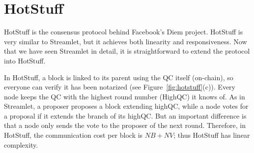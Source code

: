\documentclass{article}
\newcommand{\pramod}[1]{{\color{red}
\footnotesize[Pramod: #1] }}
\begin{document}


\section*{HotStuff}

HotStuff is the consensus protocol behind Facebook's Diem project. HotStuff is very similar to Streamlet, but it achieves both linearity and responsiveness. Now that we have seen Streamlet in detail, it is straightforward to extend the protocol into HotStuff. 

In HotStuff, a block is linked to its parent using the QC itself (on-chain), so everyone can verify it has been notarized (see Figure~\ref{fig:hotstuff}(c)).
Every node keeps the QC with the highest round number (HighQC) it knows of. As in Streamlet, a proposer proposes a block extending highQC, while a node votes for a proposal if it extends the branch of its highQC. But an important difference is that a node only sends the vote to the proposer of the next round. Therefore, in HotStuff, the communication cost per block is $NB + NV$; thus HotStuff has linear complexity.

\end{document}
